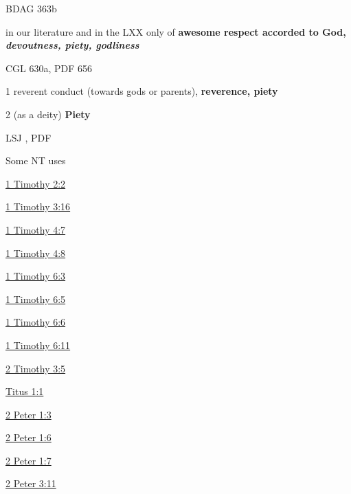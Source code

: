 				\begin{compactdesc}
					\item[BDAG 363b] \textbf{}
						\begin{compactitem}
							\item in our literature and in the LXX only of \textbf{awesome respect accorded to God, \textit{devoutness, piety, godliness}}
						\end{compactitem}
					\item[CGL 630a, PDF 656] \textbf{}
						\begin{compactitem}
							\item[1] reverent conduct (towards gods or parents), \textbf{reverence, piety}
							\item[2] (as a deity) \textbf{Piety}
						\end{compactitem}
					\item[LSJ , PDF ] \textbf{}
						\begin{compactitem}
							\item 
						\end{compactitem}
				\end{compactdesc}
				
				\begin{compactdesc}
					\item[Some NT uses] \textbf{}
						\begin{compactdesc}
							\item[{\hyperref[1TIMOTHY-2-2]{1 Timothy 2:2}}]
							\item[{\hyperref[1TIMOTHY-3-16]{1 Timothy 3:16}}]
							\item[{\hyperref[1TIMOTHY-4-7]{1 Timothy 4:7}}]
							\item[{\hyperref[1TIMOTHY-4-8]{1 Timothy 4:8}}]
							\item[{\hyperref[1TIMOTHY-6-3]{1 Timothy 6:3}}]
							\item[{\hyperref[1TIMOTHY-6-5]{1 Timothy 6:5}}]
							\item[{\hyperref[1TIMOTHY-6-6]{1 Timothy 6:6}}]
							\item[{\hyperref[1TIMOTHY-6-11]{1 Timothy 6:11}}]
							\item[{\hyperref[2TIMOTHY-3-5]{2 Timothy 3:5}}]
							\item[{\hyperref[TITUS-1-1]{Titus 1:1}}]
							\item[{\hyperref[2PETER-1-3]{2 Peter 1:3}}]
							\item[{\hyperref[2PETER-1-6]{2 Peter 1:6}}]
							\item[{\hyperref[2PETER-1-7]{2 Peter 1:7}}]
							\item[{\hyperref[2PETER-3-11]{2 Peter 3:11}}]
						\end{compactdesc}
				\end{compactdesc}
				
